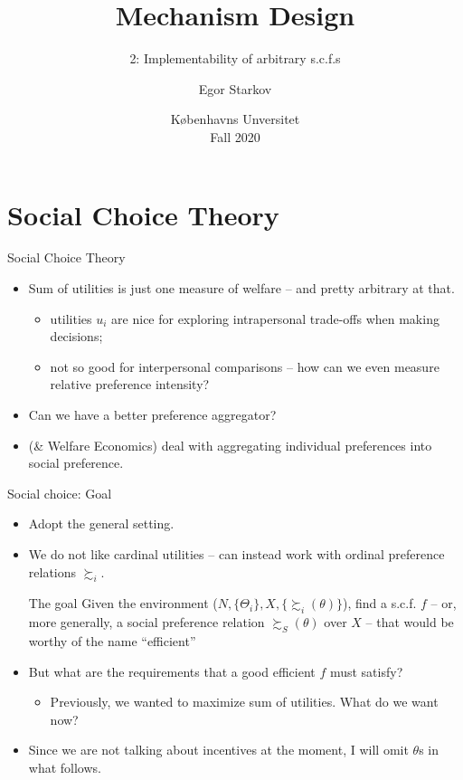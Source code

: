 \documentclass[english,10pt
,aspectratio=169
]{beamer}
\title{Mechanism Design}
\subtitle{2: Implementability of arbitrary s.c.f.s}
\author{Egor Starkov}
\date{K{\o}benhavns Unversitet \\
	Fall 2020}
\begin{document}
	\frame[plain]{\titlepage}



\section{Social Choice Theory}


\begin{frame}{Social Choice Theory}
\begin{itemize}
	\item Sum of utilities is just one measure of welfare -- and pretty arbitrary at that.
	\begin{itemize}
		\item utilities $u_i$ are nice for exploring \alert{intra}personal trade-offs when making decisions;
		\item not so good for \alert{inter}personal comparisons -- how can we even measure relative preference intensity?
	\end{itemize}
	\item Can we have a better preference aggregator?
	\item {} (\& Welfare Economics) deal with aggregating individual preferences into social preference.
\end{itemize}
\end{frame}


\begin{frame}{Social choice: Goal}
\begin{itemize}
	\item Adopt the \alert{general} setting.
	\item We do not like cardinal utilities -- can instead work with ordinal preference relations $\succsim_i$.
	\begin{exampleblock}{The goal}
		Given the environment ($N,\{\Theta_i\},X,\{\succsim_i(\theta)\}$), find a s.c.f. $f$ -- or, more generally, a social preference relation $\succsim_S(\theta)$ over $X$ -- that would be worthy of the name ``efficient''
	\end{exampleblock}
	\item But what are the requirements that a good efficient $f$ must satisfy?
	\begin{itemize}
		\item Previously, we wanted to maximize sum of utilities. What do we want now?
	\end{itemize}
	\item Since we are not talking about incentives at the moment, I will omit $\theta$s in what follows.
\end{itemize}
\end{frame}
\end{document}
